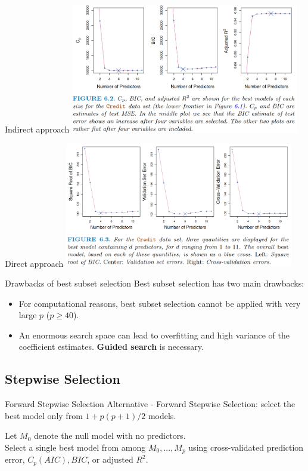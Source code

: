 \documentclass{beamer}
\begin{document}
	\begin{frame}{Indirect approach}
		\includegraphics[width=10cm]{figure_6.2.png}
	\end{frame}
	
	\begin{frame}{Direct approach}
		\includegraphics[width=10cm]{figure_6.3.png}
	\end{frame}
	
	\begin{frame}{Drawbacks of best subset selection}
		Best subset selection has two main drawbacks:
		\begin{itemize}
			\item For computational reasons, best subset selection cannot be applied with very large $p$ ($p \geq 40$).
			\item An enormous search space can lead to overﬁtting and high variance of the coefficient estimates. \textbf{Guided search} is necessary.
		\end{itemize}
	\end{frame}

	\subsection{Stepwise Selection}
	\begin{frame}{Forward Stepwise Selection}
		Alternative - Forward Stepwise Selection: select the best model only from $1+p(p+1)/2$ models.
		\begin{algorithm}[H]
			\caption{Forward Stepwise Selection}
			Let $M_0$ denote the null model with no predictors. \\
			Select a single best model from among $M_0, . . . , M_p$ using cross-validated prediction error, $C_p (AIC), BIC$, or adjusted $R^2$.
		\end{algorithm}
	\end{frame}
\end{document}
